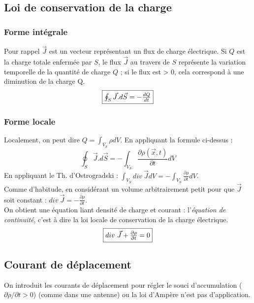 \documentclass[british,french,11pt, a4paper, openany]{book}
\begin{document}
	\subsection{Loi de conservation de la charge}
	\subsubsection{Forme intégrale}
	Pour rappel $\vec{J}$ est un vecteur représentant un flux de charge électrique. Si $Q$ est la charge totale enfermée par $S$, le flux $\vec{J}$ au travers de $S$ représente la variation temporelle de la quantité de charge $Q$ ; si le flux est > 0, cela correspond à une diminution de la charge Q.
	\begin{equation}
		\fbox{$ \oint_S \vec{J}.d\vec{S} = - \frac{dQ}{dt}$}
	\end{equation}
	
	\subsubsection{Forme locale}
	Localement, on peut dire $Q = \int_{V_S} \rho dV$. En appliquant la formule ci-dessus :
	\begin{equation}
		\oint_S \vec{J}.d\vec{S} = - \int_{V_S} \frac{\partial\rho(\vec{x}, t)}{\partial t}dV
	\end{equation}
	En appliquant le Th. d'Ostrogradski : 
	$\int_{V_S} div\ \vec{J}dV = -\int_{V_S} \frac{\partial\rho}{\partial t}dV$.\\
	Comme d'habitude, en considérant un volume arbitrairement petit pour que $\vec{J}$ soit constant : $div\ \vec{J} = -\frac{\partial \rho}{\partial t}$.\\
	
	On obtient une équation liant densité de charge et courant : l'\textit{équation de continuité}, c'est à dire la loi locale de conservation de la charge électrique.
	\begin{equation}
		\fbox{$div\ \vec{J} + \frac{\partial \rho}{\partial t} = 0 $}
	\end{equation}
	
	\subsection{Courant de déplacement}
	On introduit les courants de déplacement pour régler le souci d'accumulation ($\partial\rho /  \partial t > 0$) (comme dans une antenne) ou la loi d'Ampère n'est pas d'application.
	
\end{document}
